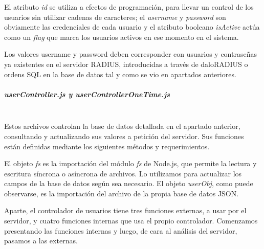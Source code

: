 El atributo \emph{id} se utiliza a efectos de programación, para llevar un control de los usuarios sin utilizar cadenas de caracteres; el \emph{username} y \emph{password} son obviamente las credenciales de cada usuario y el atributo booleano \emph{isActive} actúa como un \emph{flag} que marca los usuarios activos en ese momento en el sistema.

Los valores username y password deben corresponder con usuarios y contraseñas ya existentes en el servidor RADIUS, introducidas a través de daloRADIUS o ordens SQL en la base de datos tal y como se vio en apartados anteriores.

\subparagraph{\emph{userController.js} y \emph{userControllerOneTime.js}} \label{usersControllers} ~\\

Estos archivos controlan la base de datos detallada en el apartado anterior, consultando y actualizando sus valores a petición del servidor. Sus funciones están definidas mediante los siguientes métodos y requerimientos.


El objeto \emph{fs} es la importación del módulo \emph{fs} de Node.js, que permite la lectura y escritura síncrona o asíncrona de archivos. Lo utilizamos para actualizar los campos de la base de datos según sea necesario. El objeto \emph{userObj}, como puede observarse, es la importación del archivo de la propia base de datos JSON.

Aparte, el controlador de usuarios tiene tres funciones externas, a usar por el servidor, y cuatro funciones internas que usa el propio controlador. Comenzamos presentando las funciones internas y luego, de cara al análisis del servidor, pasamos a las externas.


